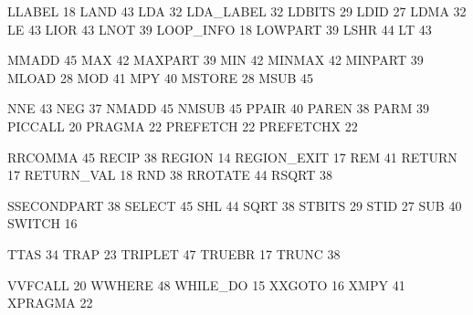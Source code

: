 \documentclass{article}
\begin{document}
LLABEL 18 
LAND 43
LDA 32 
LDA\_LABEL 32
LDBITS 29 
LDID 27
LDMA 32 
LE 43
LIOR 43 
LNOT 39
LOOP\_INFO 18 
LOWPART 39
LSHR 44 
LT 43 

MMADD 45 
MAX 42
MAXPART 39 
MIN 42
MINMAX 42 
MINPART 39
MLOAD 28 
MOD 41
MPY 40 
MSTORE 28
MSUB 45

NNE 43
NEG 37
NMADD 45 
NMSUB 45 
PPAIR 40 
PAREN 38
PARM 39 
PICCALL 20
PRAGMA 22 
PREFETCH 22
PREFETCHX 22

RRCOMMA 45 
RECIP 38
REGION 14 
REGION\_EXIT 17
REM 41 
RETURN 17
RETURN\_VAL 18 
RND 38
RROTATE 44 
RSQRT 38 

SSECONDPART 38 
SELECT 45
SHL 44 
SQRT 38
STBITS 29 
STID 27
SUB 40 
SWITCH 16 

TTAS 34 
TRAP 23
TRIPLET 47 
TRUEBR 17
TRUNC 38

VVFCALL 20 
WWHERE 48 
WHILE\_DO 15 
XXGOTO 16 
XMPY 41
XPRAGMA 22
\end{document}
